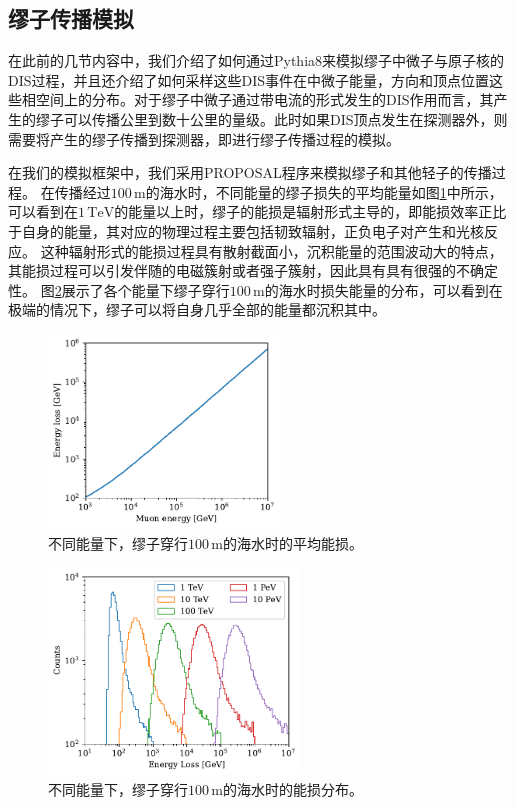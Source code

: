\subsection{缪子传播模拟}

在此前的几节内容中，我们介绍了如何通过\textsf{Pythia8}来模拟缪子中微子与原子核的DIS过程，并且还介绍了如何采样这些DIS事件在中微子能量，方向和顶点位置这些相空间上的分布。对于缪子中微子通过带电流的形式发生的DIS作用而言，其产生的缪子可以传播公里到数十公里的量级。此时如果DIS顶点发生在探测器外，则需要将产生的缪子传播到探测器，即进行缪子传播过程的模拟。

在我们的模拟框架中，我们采用\textsf{PROPOSAL}程序来模拟缪子和其他轻子的传播过程\cite{PROPOSAL:2013, PROPOSAL:2019}。
在传播经过$100\,\mathrm{m}$的海水时，不同能量的缪子损失的平均能量如图\ref{fig:muon_energy_loss}中所示，可以看到在$1\,\mathrm{TeV}$的能量以上时，缪子的能损是辐射形式主导的，即能损效率正比于自身的能量，其对应的物理过程主要包括韧致辐射，正负电子对产生和光核反应。
这种辐射形式的能损过程具有散射截面小，沉积能量的范围波动大的特点，其能损过程可以引发伴随的电磁簇射或者强子簇射，因此具有具有很强的不确定性。
图\ref{fig:muon_energy_loss_hist}展示了各个能量下缪子穿行$100\,\mathrm{m}$的海水时损失能量的分布，可以看到在极端的情况下，缪子可以将自身几乎全部的能量都沉积其中。

\begin{figure}[!ht]
\centering
    \includegraphics[width=0.55\textwidth]{img/muon_energy_loss.pdf}
    \caption{不同能量下，缪子穿行$100\,\mathrm{m}$的海水时的平均能损。}
    \label{fig:muon_energy_loss}
\end{figure}

\begin{figure}[!ht]
\centering
    \includegraphics[width=0.60\textwidth]{img/muon_energy_loss_hist.pdf}
    \caption{不同能量下，缪子穿行$100\,\mathrm{m}$的海水时的能损分布。}
    \label{fig:muon_energy_loss_hist}
\end{figure}





